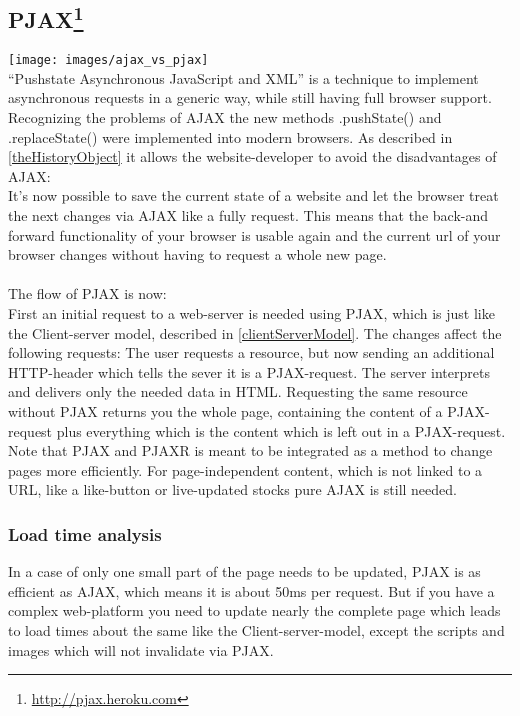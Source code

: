 \documentclass[f,bachelor,binding,twoside,palatino]{WeSTthesis}
\def \ajax {AJAX}
\def \pjax {PJAX}
\def \pjaxRequest {PJAX-request}
\def \pjaxr {PJAXR}
\begin{document}
  \subsection[\pjax]{\pjax\footnote{\url{http://pjax.heroku.com}}\label{pjax}}
	\texttt{[image: images/ajax\_vs\_pjax]}\\
	\enquote{Pushstate Asynchronous JavaScript and XML} is a technique to implement asynchronous requests in a generic way, while still having full browser support.
    Recognizing the problems of \ajax{} the new methods .pushState() and .replaceState() were implemented into modern browsers.
    As described in \ref{theHistoryObject} it allows the website-developer to avoid the disadvantages of \ajax{}:\\
    It's now possible to save the current state of a website and let the browser treat the next changes via \ajax{} like a fully request.
    This means that the back-and forward functionality of your browser is usable again and the current url of your browser changes without having to request a whole new page.\\\\
    The flow of \pjax{} is now:\\
    First an initial request to a web-server is needed using \pjax{}, which is just like the Client-server model, described in \ref{clientServerModel}. The changes affect the following requests: 
    The user requests a resource, but now sending an additional HTTP-header which tells the sever it is a \pjaxRequest{}.
    The server interprets and delivers only the needed data in HTML. Requesting the same resource without \pjax{} returns you the whole page, containing the content of a \pjaxRequest{} plus everything which is the content which is left out in a \pjaxRequest{}.
    Note that \pjax{} and \pjaxr{} is meant to be integrated as a method to change pages more efficiently. For page-independent content, which is not linked to a URL, like a like-button or live-updated stocks pure \ajax{} is still needed.

    \subsubsection{Load time analysis}
      In a case of only one small part of the page needs to be updated, \pjax{} is as efficient as \ajax{}, which means it is about 50ms per request. But if you have a complex web-platform you need to update nearly the complete page which leads to load times about the same like the Client-server-model, except the scripts and images which will not invalidate via \pjax{}.
    
\end{document}
